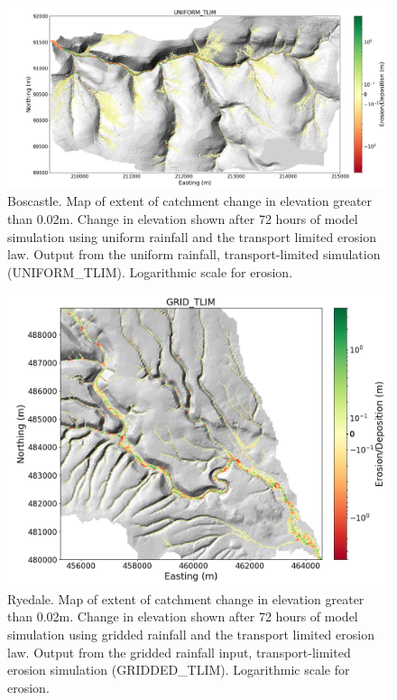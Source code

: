 \begin{figure}
\includegraphics[width=25cm]{chp06_figures_scripts/boscastle_erodediff_uniform_tlim.png}
\caption{Boscastle. Map of extent of catchment change in elevation greater than 0.02m. Change in elevation shown after 72 hours of model simulation using uniform rainfall and the transport limited erosion law. Output from the uniform rainfall, transport-limited simulation (UNIFORM\_TLIM). Logarithmic scale for erosion.}
\label{fig_boscastle_erodediff_uniform_tlim}
\end{figure}

\begin{figure}[htb]
\includegraphics[width=16cm]{chp06_figures_scripts/fig_ryedale_lower_erodediff_grid_tlim.png}
\caption{Ryedale. Map of extent of catchment change in elevation greater than 0.02m. Change in elevation shown after 72 hours of model simulation using gridded rainfall and the transport limited erosion law. Output from the gridded rainfall input, transport-limited erosion simulation (GRIDDED\_TLIM). Logarithmic scale for erosion.}
\label{fig_ryedale_erodediff_lower_grid_tlim}
\end{figure}

